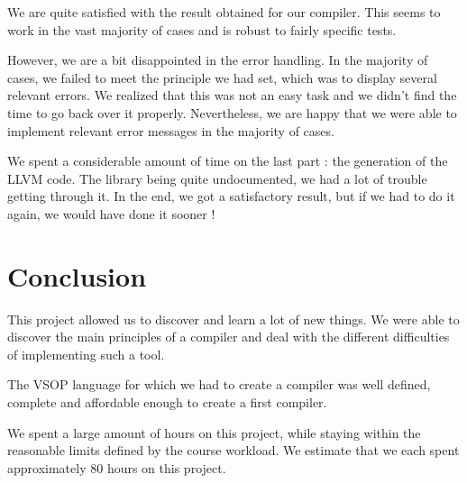 \documentclass[a4paper, 12pt]{article}
\begin{document}
    We are quite satisfied with the result obtained for our compiler. This seems to work in the vast majority of cases and is robust to fairly specific tests.
    
    However, we are a bit disappointed in the error handling. In the majority of cases, we failed to meet the principle we had set, which was to display several relevant errors. We realized that this was not an easy task and we didn't find the time to go back over it properly. Nevertheless, we are happy that we were able to implement relevant error messages in the majority of cases.
    
    We spent a considerable amount of time on the last part : the generation of the LLVM code. The library being quite undocumented, we had a lot of trouble getting through it. In the end, we got a satisfactory result, but if we had to do it again, we would have done it sooner !
    
    
    \section{Conclusion}
    
    This project allowed us to discover and learn a lot of new things. We were able to discover the main principles of a compiler and deal with the different difficulties of implementing such a tool.
    
    The VSOP language for which we had to create a compiler was well defined, complete and affordable enough to create a first compiler.
    
    We spent a large amount of hours on this project, while staying within the reasonable limits defined by the course workload. We estimate that we each spent approximately 80 hours on this project.
\end{document}

